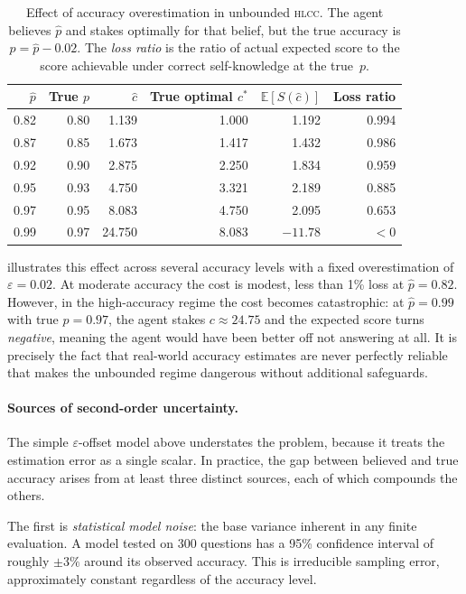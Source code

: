 \documentclass[11pt,a4paper]{article}
\newcommand{\hlcc}{\textsc{hlcc}}
\newcommand{\E}{\mathbb{E}}
\newcommand{\cstar}{c^{*}}
\begin{document}
\begin{table}[t]
\centering
\caption{Effect of accuracy overestimation in unbounded \hlcc{}.
         The agent believes $\hat{p}$ and stakes optimally for that
         belief, but the true accuracy is $p = \hat{p} - 0.02$.
         The \emph{loss ratio} is the ratio of actual expected score
         to the score achievable under correct self-knowledge at the
         true~$p$.}
\label{tab:p-uncertainty}
\begin{tabular}{@{}rrrrrr@{}}
\toprule
$\hat{p}$ & True $p$ & $\hat{c}$ & True optimal $\cstar$ &
$\E[S(\hat{c})]$ & Loss ratio \\
\midrule
0.82 & 0.80 & 1.139 & 1.000 & 1.192 & 0.994 \\
0.87 & 0.85 & 1.673 & 1.417 & 1.432 & 0.986 \\
0.92 & 0.90 & 2.875 & 2.250 & 1.834 & 0.959 \\
0.95 & 0.93 & 4.750 & 3.321 & 2.189 & 0.885 \\
0.97 & 0.95 & 8.083 & 4.750 & 2.095 & 0.653 \\
0.99 & 0.97 & 24.750 & 8.083 & $-11.78$ & $< 0$ \\
\bottomrule
\end{tabular}
\end{table}

 illustrates this effect across several
accuracy levels with a fixed overestimation of $\varepsilon = 0.02$.
At moderate accuracy the cost is modest, less than 1\% loss at
$\hat{p} = 0.82$.  However, in the high-accuracy regime the cost
becomes catastrophic: at $\hat{p} = 0.99$ with true $p = 0.97$, the
agent stakes $c \approx 24.75$ and the expected score turns
\emph{negative}, meaning the agent would have been better off not
answering at all.  It is precisely the fact that real-world accuracy
estimates are never perfectly reliable that makes the unbounded
regime dangerous without additional safeguards.

\paragraph{Sources of second-order uncertainty.}
The simple $\varepsilon$-offset model above understates the problem,
because it treats the estimation error as a single scalar.  In
practice, the gap between believed and true accuracy arises from at
least three distinct sources, each of which compounds the others.

The first is \emph{statistical model noise}: the base variance
inherent in any finite evaluation.  A model tested on 300 questions
has a 95\% confidence interval of roughly $\pm\!3\%$ around its
observed accuracy.  This is irreducible sampling error, approximately
constant regardless of the accuracy level.
\end{document}
